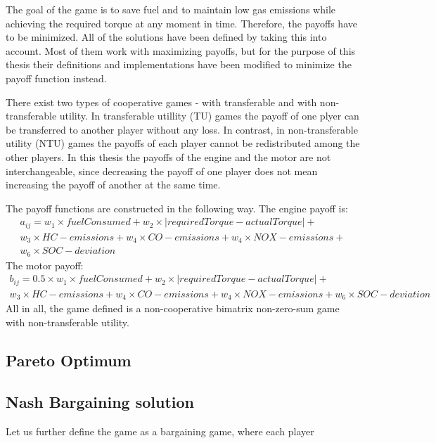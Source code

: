 The goal of the game is to save fuel and to maintain low gas emissions while achieving the required torque at any moment in time. Therefore, the payoffs have to be minimized. All of the solutions have been defined by taking this into account. Most of them work with maximizing payoffs, but for the purpose of this thesis their definitions and implementations have been modified to minimize the payoff function instead. 


There exist two types of cooperative games - with transferable and with non-transferable utility. In transferable utillity (TU) games the payoff of one plyer can be transferred to another player without any loss. In contrast, in non-transferable utility (NTU) games the payoffs of each player cannot be redistributed among the other players. In this thesis the payoffs of the engine and the motor are not interchangeable, since decreasing the payoff of one player does not mean increasing the payoff of another at the same time.

The payoff functions are constructed in the following way. The engine payoff is:
\begin{equation}
\begin{split}
a_{ij} = w_1 \times fuelConsumed + w_2 \times | requiredTorque - actualTorque | + \\
w_3 \times HC-emissions + w_4 \times CO-emissions + w_4 \times NOX-emissions + \\
w_6 \times SOC-deviation
\end{split}
\end{equation}
The motor payoff:
\begin{equation}
\begin{split}
b_{ij} = 0.5 \times w_1 \times fuelConsumed + w_2 \times | requiredTorque - actualTorque | + \\
w_3 \times HC-emissions + w_4 \times CO-emissions + w_4 \times NOX-emissions + w_6 \times SOC-deviation
\end{split}
\end{equation}
All in all, the game defined is a non-cooperative bimatrix non-zero-sum game with non-transferable utility.

\subsection{Pareto Optimum}

\subsection{Nash Bargaining solution}
Let us further define the game as a bargaining game, where each player 


